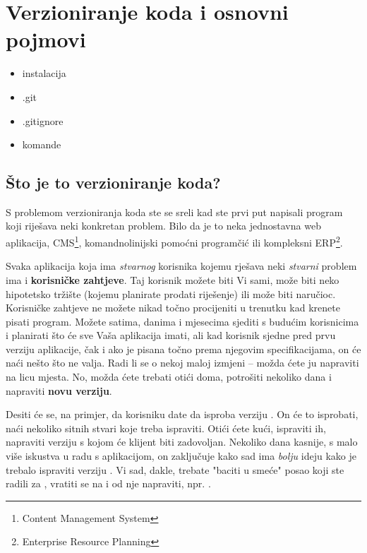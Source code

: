 \chapter*{Verzioniranje koda i osnovni pojmovi}

\begin{itemize}
   \item instalacija
   \item .git
   \item .gitignore
   \item komande
\end{itemize}

\section*{Što je to verzioniranje koda?}

S problemom verzioniranja koda ste se sreli kad ste prvi put napisali program koji riješava neki konkretan problem. 
Bilo da je to neka jednostavna web aplikacija, CMS\footnote{Content Management System}, komandnolinijski pomoćni programčić ili kompleksni ERP\footnote{Enterprise Resource Planning}.

Svaka aplikacija koja ima \textit{stvarnog} korisnika kojemu rješava neki \textit{stvarni} problem ima i \textbf{korisničke zahtjeve}.
Taj korisnik možete biti Vi sami, može biti neko hipotetsko tržište (kojemu planirate prodati riješenje) ili može biti naručioc.
Korisničke zahtjeve ne možete nikad točno procijeniti u trenutku kad krenete pisati program.
Možete satima, danima i mjesecima sjediti s budućim korisnicima i planirati što će sve Vaša aplikacija imati, ali kad korisnik sjedne pred prvu verziju aplikacije, čak i ako je pisana točno prema njegovim specifikacijama, on će naći nešto što ne valja. 
Radi li se o nekoj maloj izmjeni -- možda ćete ju napraviti na licu mjesta. No, možda ćete trebati otići doma, potrošiti nekoliko dana i napraviti \textbf{novu verziju}.

Desiti će se, na primjer, da korisniku date da isproba verziju .
On će to isprobati, naći nekoliko sitnih stvari koje treba ispraviti.
Otići ćete kući, ispraviti ih, napraviti verziju  s kojom će klijent biti zadovoljan.
Nekoliko dana kasnije, s malo više iskustva u radu s aplikacijom, on zaključuje kako sad ima \textit{bolju} ideju kako je trebalo ispraviti verziju .
Vi sad, dakle, trebate "baciti u smeće" posao koji ste radili za , vratiti se na  i od nje napraviti, npr. .

